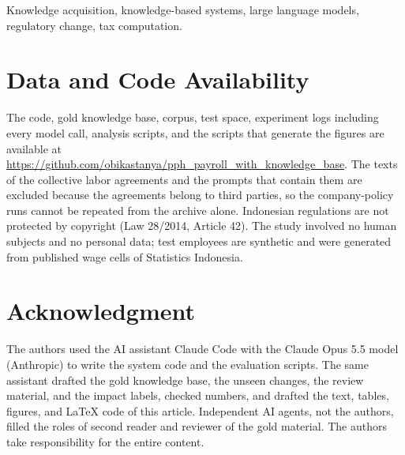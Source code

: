 \documentclass{ieeeaccess}
\begin{document}
\begin{keywords}
Knowledge acquisition, knowledge-based systems, large language models, regulatory change, tax computation.
\end{keywords}

\titlepgskip=-21pt

\maketitle












\section*{Data and Code Availability}
The code, gold knowledge base, corpus, test space, experiment logs including every model call, analysis scripts, and the scripts that generate the figures are available at \url{https://github.com/obikastanya/pph_payroll_with_knowledge_base}. The texts of the collective labor agreements and the prompts that contain them are excluded because the agreements belong to third parties, so the company-policy runs cannot be repeated from the archive alone. Indonesian regulations are not protected by copyright (Law 28/2014, Article 42). The study involved no human subjects and no personal data; test employees are synthetic and were generated from published wage cells of Statistics Indonesia.

\appendices


\section*{Acknowledgment}
The authors used the AI assistant Claude Code with the Claude Opus 5.5 model (Anthropic) to write the system code and the evaluation scripts. The same assistant drafted the gold knowledge base, the unseen changes, the review material, and the impact labels, checked numbers, and drafted the text, tables, figures, and \LaTeX{} code of this article. Independent AI agents, not the authors, filled the roles of second reader and reviewer of the gold material. The authors take responsibility for the entire content.



\end{document}
